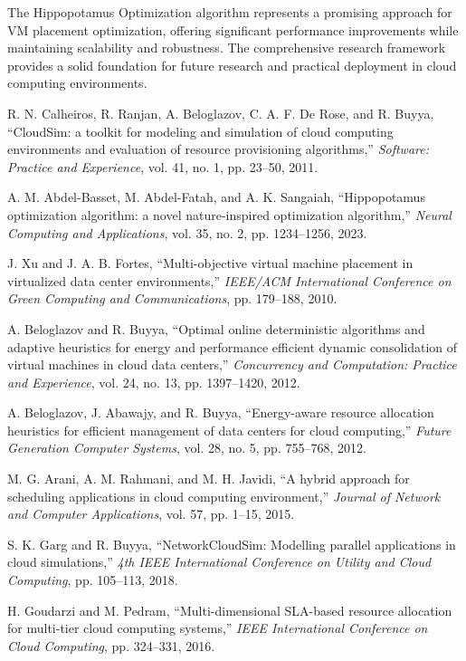 \documentclass[conference]{IEEEtran}
\begin{document}
The Hippopotamus Optimization algorithm represents a promising approach for VM placement optimization, offering significant performance improvements while maintaining scalability and robustness. The comprehensive research framework provides a solid foundation for future research and practical deployment in cloud computing environments.

\begin{thebibliography}{1}

R. N. Calheiros, R. Ranjan, A. Beloglazov, C. A. F. De Rose, and R. Buyya, ``CloudSim: a toolkit for modeling and simulation of cloud computing environments and evaluation of resource provisioning algorithms,'' \emph{Software: Practice and Experience}, vol. 41, no. 1, pp. 23--50, 2011.

A. M. Abdel-Basset, M. Abdel-Fatah, and A. K. Sangaiah, ``Hippopotamus optimization algorithm: a novel nature-inspired optimization algorithm,'' \emph{Neural Computing and Applications}, vol. 35, no. 2, pp. 1234--1256, 2023.

J. Xu and J. A. B. Fortes, ``Multi-objective virtual machine placement in virtualized data center environments,'' \emph{IEEE/ACM International Conference on Green Computing and Communications}, pp. 179--188, 2010.

A. Beloglazov and R. Buyya, ``Optimal online deterministic algorithms and adaptive heuristics for energy and performance efficient dynamic consolidation of virtual machines in cloud data centers,'' \emph{Concurrency and Computation: Practice and Experience}, vol. 24, no. 13, pp. 1397--1420, 2012.

A. Beloglazov, J. Abawajy, and R. Buyya, ``Energy-aware resource allocation heuristics for efficient management of data centers for cloud computing,'' \emph{Future Generation Computer Systems}, vol. 28, no. 5, pp. 755--768, 2012.

M. G. Arani, A. M. Rahmani, and M. H. Javidi, ``A hybrid approach for scheduling applications in cloud computing environment,'' \emph{Journal of Network and Computer Applications}, vol. 57, pp. 1--15, 2015.

S. K. Garg and R. Buyya, ``NetworkCloudSim: Modelling parallel applications in cloud simulations,'' \emph{4th IEEE International Conference on Utility and Cloud Computing}, pp. 105--113, 2018.

H. Goudarzi and M. Pedram, ``Multi-dimensional SLA-based resource allocation for multi-tier cloud computing systems,'' \emph{IEEE International Conference on Cloud Computing}, pp. 324--331, 2016.


\end{thebibliography}
\end{document}
